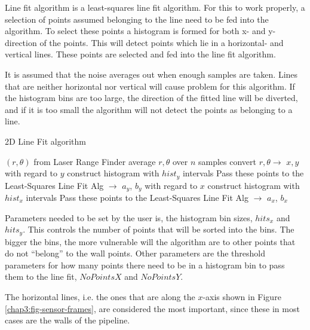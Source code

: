 Line fit algorithm is a least-squares line fit algorithm. For this to work properly, a
selection of points assumed belonging to the line need to be fed into the algorithm. To
select these points a histogram is formed for both x- and y-direction of the points. This
will detect points which lie in a horizontal- and vertical lines. These points are selected
and fed into the line fit algorithm. 

It is assumed that the noise averages out when
enough samples are taken. Lines that are neither horizontal nor vertical
will cause problem for this algorithm. If the
histogram bins are too large, the direction of the fitted line will be diverted, and if it
is too small the algorithm will not detect the points as belonging to a line. 
\begin{algorithm}[htbp]
    \caption{2D Line Fit algorithm}
    \label{chap5:alg-2dlinefit}
    \begin{algorithmic}
        \REQUIRE $(r, \theta)$ from Laser Range Finder
        \STATE average $r, \theta$ over $n$ samples
        \STATE convert $r, \theta \rightarrow$ $x, y$ 
        \STATE with regard to $y$ construct histogram with $hist_y$ intervals
                \STATE Pass these points to the Least-Squares Line Fit Alg $\rightarrow$ $a_y$, $b_y$
            \ENDIF
        \ENDFOR
        \STATE with regard to $x$ construct histogram with $hist_x$ intervals
                \STATE Pass these points to the Least-Squares Line Fit Alg $\rightarrow$ $a_x$, $b_x$
            \ENDIF
        \ENDFOR
    \end{algorithmic}
\end{algorithm}

Parameters needed to be set by the user is, the histogram bin sizes, $hits_x$ and
$hits_y$. This controls the number of points that will be sorted into the bins. The bigger
the bins, the more vulnerable will the algorithm are to 
other points that do not ``belong'' to the wall points. Other parameters are the
threshold parameters for how many points there need to be in a histogram bin to pass them
to the line fit, $NoPointsX$ and $NoPointsY$.\

The horizontal lines, i.e. the ones that are along the $x$-axis shown in Figure
\ref{chap3:fig-sensor-frames}, are considered the most important, since these in most cases
are the walls of the pipeline. 

